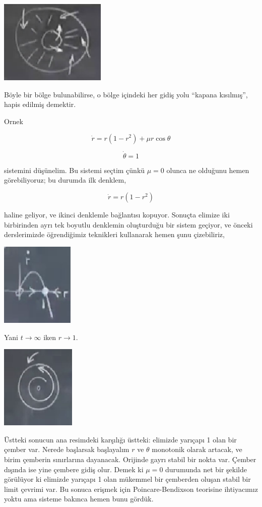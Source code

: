 \documentclass[12pt,fleqn]{article}\usepackage{../../common}
\begin{document}
\includegraphics[height=4cm]{09_08.png}

Böyle bir bölge bulunabilirse, o bölge içindeki her gidiş yolu ``kapana
kısılmış'', hapis edilmiş demektir.

Ornek

$$ \dot{r} = r(1-r^2) + \mu r \cos\theta $$

$$ \dot{\theta} = 1 $$

sistemini düşünelim. Bu sistemi seçtim çünkü $\mu=0$ olunca ne olduğunu hemen
görebiliyoruz; bu durumda ilk denklem,

$$ \dot{r} = r(1-r^2) $$

haline geliyor, ve ikinci denklemle bağlantısı kopuyor. Sonuçta elimize iki
birbirinden ayrı tek boyutlu denklemin oluşturduğu bir sistem geçiyor, ve önceki
derslerimizde öğrendiğimiz teknikleri kullanarak hemen şunu çizebiliriz,

\includegraphics[height=4cm]{09_09.png}

Yani $t \to \infty$ iken $r \to 1$. 

\includegraphics[height=4cm]{09_10.png}

Üstteki sonucun ana resimdeki karşılığı üstteki: elimizde yarıçapı 1 olan bir
çember var. Nerede başlarsak başlayalım $r$ ve $\theta$ monotonik olarak
artacak, ve birim çemberin sınırlarına dayanacak. Orijinde gayrı stabil bir
nokta var. Çember dışında ise yine çembere gidiş olur. Demek ki $\mu=0$
durumunda net bir şekilde görülüyor ki elimizde yarıçapı 1 olan mükemmel bir
çemberden oluşan stabil bir limit çevrimi var. Bu sonuca erişmek için
Poincare-Bendixson teorisine ihtiyacımız yoktu ama sisteme bakınca hemen bunu
gördük. 
\end{document}
